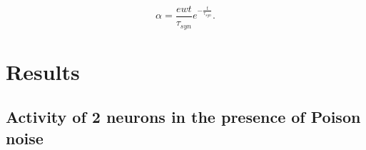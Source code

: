 \documentclass[aps,pre,twocolumn,groupedaddress]{revtex4-1}
\begin{document}
\begin{equation}
	\label{eq:alpha}
\alpha = \frac{e w t}{\tau_{syn}} e^{-\frac{t}{\tau_{syn}}}.
\end{equation} 

\section{Results}
\label{ss:results}

\subsection{Activity of 2 neurons in the presence of Poison noise}
\label{ss:switchact}



%


\end{document}
